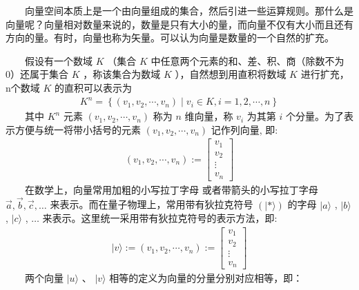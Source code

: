 \documentclass[a4paper,11pt,english]{sphinxmanual}
\begin{document}
\sphinxAtStartPar
​  向量空间本质上是一个由向量组成的集合，然后引进一些运算规则。那什么是向量呢？向量相对数量来说的，数量是只有大小的量，而向量不仅有大小而且还有方向的量。有时，向量也称为矢量。可以认为向量是数量的一个自然的扩充。

\sphinxAtStartPar
​  假设有一个数域 \(K\) （集合  \(K\) 中任意两个元素的和、差、积、商（除数不为0）还属于集合 \(K\) ，称该集合为数域 \(K\) ），自然想到用直积将数域 \(K\) 进行扩充，n个数域 \(K\) 的直积可以表示为
\begin{equation*}
\begin{split}K^{n}=\left\{\left(v_{1}, v_{2}, \cdots, v_{n}\right) \mid v_{i} \in K, i=1,2, \cdots, n\right\}\end{split}
\end{equation*}
\sphinxAtStartPar
​  其中  \(K^{n}\) 元素  \(\left(v_{1}, v_{2}, \cdots, v_{n}\right)\) 称为  \(n\) 维向量，称  \(v_{i}\) 为其第  \(i\) 个分量。为了表示方便与统一将带小括号的元素  \(\left(v_{1}, v_{2}, \cdots, v_{n}\right)\) 记作列向量, 即:
\begin{equation*}
\begin{split}\left(v_{1}, v_{2}, \cdots, v_{n}\right):=\left[\begin{array}{c} v_{1} \\ v_{2} \\ \vdots \\ v_{n} \end{array}\right]\end{split}
\end{equation*}
\sphinxAtStartPar
​  在数学上，向量常用加粗的小写拉丁字母   或者带箭头的小写拉丁字母  \(\vec{a}, \vec{b},\vec{c},\ldots\) 来表示。而在量子物理上，常用带有狄拉克符号  \((|*\rangle)\) 的字母  \(|a\rangle\) , \(|b\rangle\) , \(|c\rangle\) , \(\ldots\) 来表示。这里统一采用带有狄拉克符号的表示方法，即:
\begin{equation*}
\begin{split}|v\rangle:=\left(v_{1}, v_{2}, \cdots, v_{n}\right):=\left[\begin{array}{c} v_{1} \\ v_{2} \\ \vdots \\ v_{n} \end{array}\right]\end{split}
\end{equation*}
\sphinxAtStartPar
​  两个向量  \(| {u}\rangle\) 、 \(| {v}\rangle\) 相等的定义为向量的分量分别对应相等，即：
\end{document}
